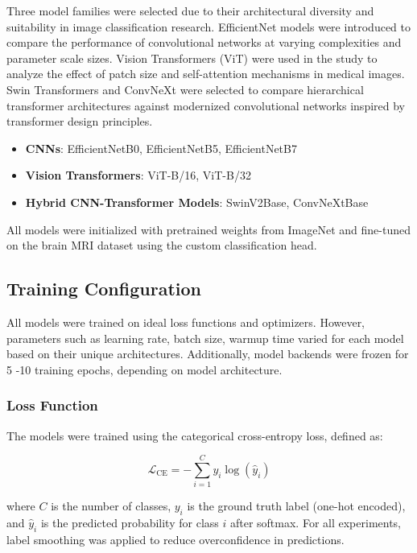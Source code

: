 \documentclass[11pt]{article}
\begin{document}
Three model families were selected due to their architectural diversity and suitability in image classification research. EfficientNet models \parencite{tan2019efficientnet} were introduced to compare the performance of convolutional networks at varying complexities and parameter scale sizes. Vision Transformers (ViT) \parencite{dosovitskiy2020vit} were used in the study to analyze the effect of patch size and self-attention mechanisms in medical images. Swin Transformers \parencite{liu2021swin} and ConvNeXt \parencite{liu2022convnext} were selected to compare hierarchical transformer architectures against modernized convolutional networks inspired by transformer design principles.

\begin{itemize}
\item \textbf{CNNs}: EfficientNetB0, EfficientNetB5, EfficientNetB7
\item \textbf{Vision Transformers}: ViT-B/16, ViT-B/32
\item \textbf{Hybrid CNN-Transformer Models}: SwinV2Base, ConvNeXtBase
\end{itemize}



All models were initialized with pretrained weights from ImageNet and fine-tuned on the brain MRI dataset using the custom classification head.

\subsection*{Training Configuration}
All models were trained on ideal loss functions and optimizers. However, parameters such as learning rate, batch size, warmup time varied for each model based on their unique architectures. Additionally, model backends were frozen for 5 -10 training epochs, depending on model architecture.

\subsubsection*{Loss Function}

The models were trained using the categorical cross-entropy loss, defined as:

\[
\mathcal{L}_{\text{CE}} = - \sum_{i=1}^{C} y_i \log(\hat{y}_i)
\]

where \( C \) is the number of classes, \( y_i \) is the ground truth label (one-hot encoded), and \( \hat{y}_i \) is the predicted probability for class \( i \) after softmax. For all experiments, label smoothing was applied to reduce overconfidence in predictions.
\end{document}
